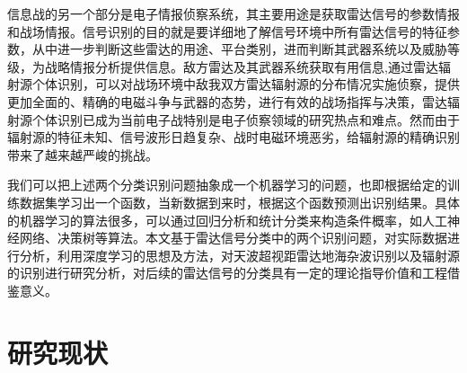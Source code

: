 信息战的另一个部分是电子情报侦察系统，其主要用途是获取雷达信号的参数情报和战场情报。信号识别的目的就是要详细地了解信号环境中所有雷达信号的特征参数，从中进一步判断这些雷达的用途、平台类别，进而判断其武器系统以及威胁等级，为战略情报分析提供信息。敌方雷达及其武器系统获取有用信息,通过雷达辐射源个体识别，可以对战场环境中敌我双方雷达辐射源的分布情况实施侦察，提供更加全面的、精确的电磁斗争与武器的态势，进行有效的战场指挥与决策，雷达辐射源个体识别已成为当前电子战特别是电子侦察领域的研究热点和难点\cite{matuszewski2008specific}。然而由于辐射源的特征未知、信号波形日趋复杂、战时电磁环境恶劣，给辐射源的精确识别带来了越来越严峻的挑战。

我们可以把上述两个分类识别问题抽象成一个机器学习的问题，也即根据给定的训练数据集学习出一个函数，当新数据到来时，根据这个函数预测出识别结果。具体的机器学习的算法很多，可以通过回归分析和统计分类来构造条件概率，如人工神经网络、决策树等算法。本文基于雷达信号分类中的两个识别问题，对实际数据进行分析，利用深度学习的思想及方法，对天波超视距雷达地海杂波识别以及辐射源的识别进行研究分析，对后续的雷达信号的分类具有一定的理论指导价值和工程借鉴意义。

\section{研究现状}
